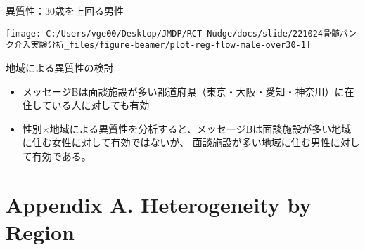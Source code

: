 \documentclass[
      aspectratio=169,
        12pt,
    ]{beamer}
\providecommand{\tightlist}{%
  \setlength{\itemsep}{0pt}\setlength{\parskip}{0pt}}
\begin{document}
\begin{frame}{異質性：30歳を上回る男性}
\protect\hypertarget{ux7570ux8ceaux602730ux6b73ux3092ux4e0aux56deux308bux7537ux6027}{}
\begin{center}\texttt{[image: C:/Users/vge00/Desktop/JMDP/RCT-Nudge/docs/slide/221024骨髄バンク介入実験分析\_files/figure-beamer/plot-reg-flow-male-over30-1]} \end{center}
\end{frame}

\begin{frame}{地域による異質性の検討}
\protect\hypertarget{ux5730ux57dfux306bux3088ux308bux7570ux8ceaux6027ux306eux691cux8a0e}{}
\begin{itemize}
\tightlist
\item
  メッセージBは面談施設が多い都道府県（東京・大阪・愛知・神奈川）に在住している人に対しても有効
\item
  性別×地域による異質性を分析すると、メッセージBは面談施設が多い地域に住む女性に対して有効ではないが、
  面談施設が多い地域に住む男性に対して有効である。
\end{itemize}
\end{frame}

\hypertarget{appendix-a.-heterogeneity-by-region}{%
\section{Appendix A. Heterogeneity by Region}\label{appendix-a.-heterogeneity-by-region}}
\end{document}
